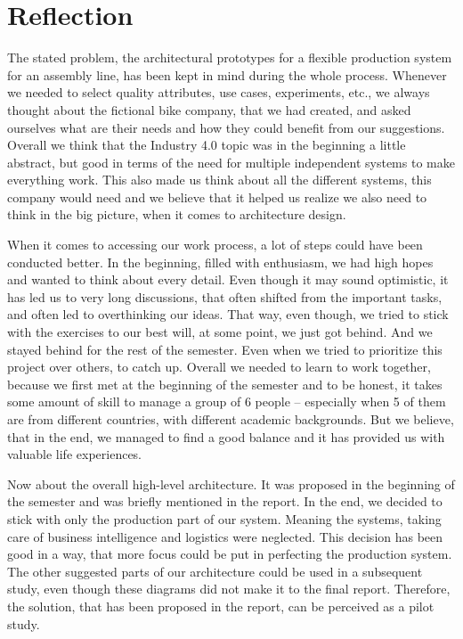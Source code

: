 \documentclass[conference]{IEEEtran}
\begin{document}
\section{Reflection}
The stated problem, the architectural prototypes for a flexible production system for an assembly line, has been kept in mind during the whole process. Whenever we needed to select quality attributes, use cases, experiments, etc., we always thought about the fictional bike company, that we had created, and asked ourselves what are their needs and how they could benefit from our suggestions. Overall we think that the Industry 4.0 topic was in the beginning a little abstract, but good in terms of the need for multiple independent systems to make everything work. This also made us think about all the different systems, this company would need and we believe that it helped us realize we also need to think in the big picture, when it comes to architecture design.   

When it comes to accessing our work process, a lot of steps could have been conducted better. In the beginning, filled with enthusiasm, we had high hopes and wanted to think about every detail. Even though it may sound optimistic, it has led us to very long discussions, that often shifted from the important tasks, and often led to overthinking our ideas. That way, even though, we tried to stick with the exercises to our best will, at some point, we just got behind. And we stayed behind for the rest of the semester. Even when we tried to prioritize this project over others, to catch up. Overall we needed to learn to work together, because we first met at the beginning of the semester and to be honest, it takes some amount of skill to manage a group of 6 people -- especially when 5 of them are from different countries, with different academic backgrounds. But we believe, that in the end, we managed to find a good balance and it has provided us with valuable life experiences.   

Now about the overall high-level architecture. It was proposed in the beginning of the semester and was briefly mentioned in the report. In the end, we decided to stick with only the production part of our system. Meaning the systems, taking care of business intelligence and logistics were neglected. This decision has been good in a way, that more focus could be put in perfecting the production system. The other suggested parts of our architecture could be used in a subsequent study, even though these diagrams did not make it to the final report. Therefore, the solution, that has been proposed in the report, can be perceived as a pilot study. 
\end{document}
